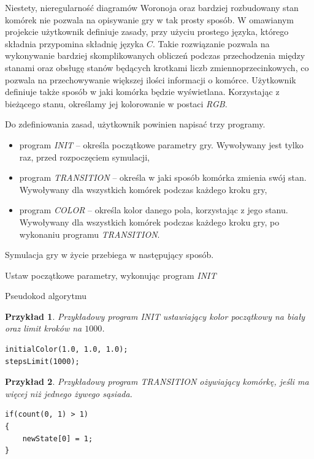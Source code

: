 \documentclass[declaration,shortabstract, inz]{iithesis}
\theoremstyle{definition} \newtheorem{definition}{Definicja}[]
\theoremstyle{plain} \newtheorem{remark}[definition]{Obserwacja}
\theoremstyle{plain} \newtheorem{theorem}[definition]{Twierdzenie}
\theoremstyle{plain} \newtheorem{example}{Przykład}[definition]
\theoremstyle{plain} \newtheorem{lemma}[definition]{Lemat}
\begin{document}
Niestety, nieregularność diagramów Woronoja oraz bardziej rozbudowany stan komórek nie pozwala na opisywanie gry w tak prosty sposób. W omawianym projekcie użytkownik definiuje zasady, przy użyciu prostego języka, którego składnia przypomina składnię języka $C$. Takie rozwiązanie pozwala na wykonywanie bardziej skomplikowanych obliczeń podczas przechodzenia między stanami oraz obsługę stanów będących krotkami liczb zmiennoprzecinkowych, co pozwala na przechowywanie większej ilości informacji o komórce. Użytkownik definiuje także sposób w jaki komórka będzie wyświetlana. Korzystając z bieżącego stanu, określamy jej kolorowanie w postaci \textit{RGB}.

Do zdefiniowania zasad, użytkownik powinien napisać trzy programy. 
\begin{itemize}
\item program \textit{INIT} -- określa początkowe parametry gry. Wywoływany jest tylko raz, przed rozpoczęciem symulacji,
\item program \textit{TRANSITION} -- określa w jaki sposób komórka zmienia swój stan. Wywoływany dla wszystkich komórek podczas każdego kroku gry,
\item program \textit{COLOR} -- określa kolor danego pola, korzystając z jego stanu. Wywoływany dla wszystkich komórek podczas każdego kroku gry, po wykonaniu programu \textit{TRANSITION}.
\end{itemize}

Symulacja gry w życie przebiega w następujący sposób.

\begin{algorithm}[H]
\SetAlgoLined
	Ustaw początkowe parametry, wykonując program \textit{INIT}\\
 \caption{Pseudokod algorytmu}
\end{algorithm}


\begin{example}
Przykładowy program \textit{INIT} ustawiający kolor początkowy na biały oraz limit kroków na $1000$.
\begin{center}
\begin{lstlisting}
initialColor(1.0, 1.0, 1.0);
stepsLimit(1000);
\end{lstlisting}
\end{center}
\end{example}

\begin{example}
Przykładowy program \textit{TRANSITION} ożywiający komórkę, jeśli ma więcej niż jednego żywego sąsiada.
\begin{center}
\begin{lstlisting}
if(count(0, 1) > 1)
{
	newState[0] = 1;
}
\end{lstlisting}
\end{center}
\end{example}
\end{document}
